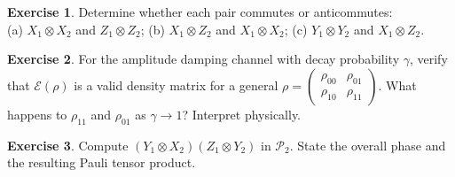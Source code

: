 \documentclass[11pt, a4paper]{article}
\theoremstyle{definition}
\newtheorem{exercise}{Exercise}[section]
\theoremstyle{plain}
\theoremstyle{remark}
\begin{document}
\begin{exercise}
Determine whether each pair commutes or anticommutes:\\
(a) $X_1\otimes X_2$ and $Z_1\otimes Z_2$;\quad
(b) $X_1\otimes Z_2$ and $X_1\otimes X_2$;\quad
(c) $Y_1\otimes Y_2$ and $X_1\otimes Z_2$.
\end{exercise}

\begin{exercise}
For the amplitude damping channel with decay probability $\gamma$, verify
that $\mathcal{E}(\rho)$ is a valid density matrix for a general
$\rho = \begin{pmatrix}\rho_{00}&\rho_{01}\\\rho_{10}&\rho_{11}\end{pmatrix}$.
What happens to $\rho_{11}$ and $\rho_{01}$ as $\gamma\to1$?  Interpret
physically.
\end{exercise}

\begin{exercise}
Compute $(Y_1\otimes X_2)(Z_1\otimes Y_2)$ in $\mathcal{P}_2$.  State
the overall phase and the resulting Pauli tensor product.
\end{exercise}
\end{document}
